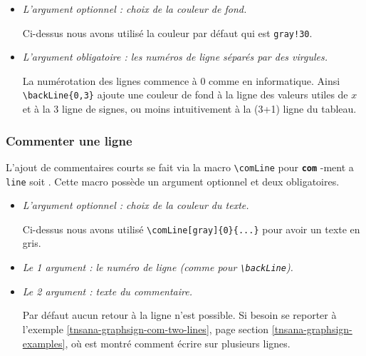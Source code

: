 \documentclass[12pt,a4paper]{book}
\makeatletter
\newcommand\env[1]{\texttt{#1}}
\newcommand\macro[1]{\env{\textbackslash{}#1}}
\theoremstyle{definition}
\newcommand\whyprefix[2]{%
	\textbf{\prefix{#1}}-#2%
}
\newcommand\prefix[1]{%
	\texttt{#1}%
}
\newcommand\inenglish{\@ifstar{\@inenglish@star}{\@inenglish@no@star}}
\newcommand\@inenglish@star[1]{%
	\emph{\og #1 \fg}%
}
\newcommand\@inenglish@no@star[1]{%
	\@inenglish@star{#1} en anglais%
}
\makeatother
\begin{document}
{{\begin{itemize}[label=\small\textbullet, itemsep=.25em]
    \item \textit{L'argument optionnel : choix de la couleur de fond.}
          
          \smallskip
          
          Ci-dessus nous avons utilisé la couleur par défaut qui est  \verb#gray!30#.


    \medskip
    \item \textit{L'argument obligatoire : les numéros de ligne séparés par des virgules.}
          
          \smallskip
          
          La numérotation des lignes commence à $0$ comme en informatique. Ainsi \verb#\backLine{0,3}# ajoute une couleur de fond à la ligne des valeurs utiles de $x$ et à la 3\ieme{} ligne de signes, ou moins intuitivement à la (3+1)\ieme{} ligne du tableau.
\end{itemize}





\subsubsection{Commenter une ligne}

L'ajout de commentaires courts se fait via la macro \macro{comLine} pour \whyprefix{com}{ment a} \prefix{line} soit \inenglish{commenter une ligne}.
Cette macro possède un argument optionnel et deux obligatoires.

\begin{itemize}[label=\small\textbullet, itemsep=.25em]
    \item \textit{L'argument optionnel : choix de la couleur du texte.}
          
          \smallskip
          
          Ci-dessus nous avons utilisé \verb#\comLine[gray]{0}{...}# pour avoir un texte en gris.


    \item \textit{Le 1\ier{} argument : le numéro de ligne \emph{(comme pour \macro{backLine})}.}


    \item \textit{Le 2\ieme{} argument : texte du commentaire.}
          
          \smallskip
          
          Par défaut aucun retour à la ligne n'est possible.
          Si besoin se reporter à l'exemple \ref{tnsana-graphsign-com-two-lines},  page \pageref{tnsana-graphsign-com-two-lines} section \ref{tnsana-graphsign-examples}, où est montré comment écrire sur plusieurs lignes.
\end{itemize}


}}
\end{document}
